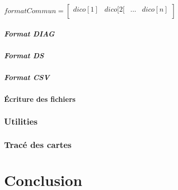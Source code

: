 \documentclass[11p, a4papert]{article}
\begin{document}
\begin{center}
$formatCommun = \left[\begin{array}{cccc} dico[1] & dico[2[ & ... & dico[n] \\ \end{array}\right]$
\end{center}

\subsubsection{Format DIAG}
\subsubsection{Format DS}
\subsubsection{Format CSV}

\subsection{Écriture des fichiers} %
\section{Utilities}
\section{Tracé des cartes}
\part{Conclusion}
\end{document}
